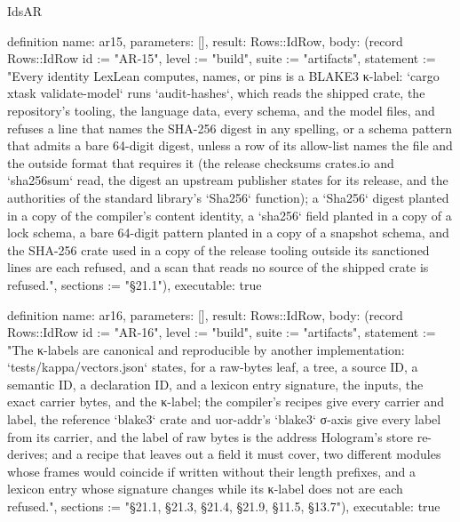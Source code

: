 \begin{lexlean}{IdsAR}
\begin{semanticmodule}
definition{
  name: ar15,
  parameters: [],
  result: Rows::IdRow,
  body: (record Rows::IdRow {id := "AR-15", level := "build", suite := "artifacts", statement := "Every identity LexLean computes, names, or pins is a BLAKE3 κ-label: `cargo xtask validate-model` runs `audit-hashes`, which reads the shipped crate, the repository's tooling, the language data, every schema, and the model files, and refuses a line that names the SHA-256 digest in any spelling, or a schema pattern that admits a bare 64-digit digest, unless a row of its allow-list names the file and the outside format that requires it (the release checksums crates.io and `sha256sum` read, the digest an upstream publisher states for its release, and the authorities of the standard library's `Sha256` function); a `Sha256` digest planted in a copy of the compiler's content identity, a `sha256` field planted in a copy of a lock schema, a bare 64-digit pattern planted in a copy of a snapshot schema, and the SHA-256 crate used in a copy of the release tooling outside its sanctioned lines are each refused, and a scan that reads no source of the shipped crate is refused.", sections := "§21.1"}),
  executable: true
}

definition{
  name: ar16,
  parameters: [],
  result: Rows::IdRow,
  body: (record Rows::IdRow {id := "AR-16", level := "build", suite := "artifacts", statement := "The κ-labels are canonical and reproducible by another implementation: `tests/kappa/vectors.json` states, for a raw-bytes leaf, a tree, a source ID, a semantic ID, a declaration ID, and a lexicon entry signature, the inputs, the exact carrier bytes, and the κ-label; the compiler's recipes give every carrier and label, the reference `blake3` crate and uor-addr's `blake3` σ-axis give every label from its carrier, and the label of raw bytes is the address Hologram's store re-derives; and a recipe that leaves out a field it must cover, two different modules whose frames would coincide if written without their length prefixes, and a lexicon entry whose signature changes while its κ-label does not are each refused.", sections := "§21.1, §21.3, §21.4, §21.9, §11.5, §13.7"}),
  executable: true
}
\end{semanticmodule}
\end{lexlean}
